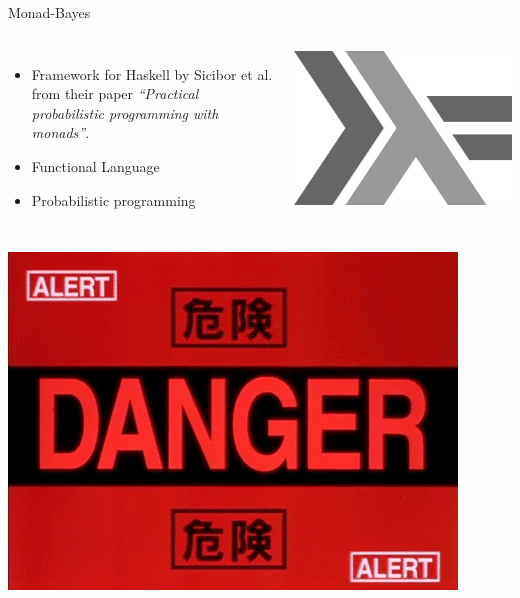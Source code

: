 \documentclass[usenames,dvipsnames,10pt]{beamer}
\begin{document}
\begin{frame}{Monad-Bayes}
    \begin{columns}[T,onlytextwidth]
        \begin{itemize}
            
            \item Framework for \alert{Haskell} by Sicibor et al. from their paper \emph{``Practical probabilistic programming with monads''}.

\item Functional Language

\item Probabilistic programming
        \end{itemize}


    \includegraphics[width=\textwidth]{images/haskell.png}
    \end{columns}
\end{frame}

\begin{frame}\centering
    \includegraphics[width=\textwidth]{images/danger.png}
\end{frame}
\end{document}
